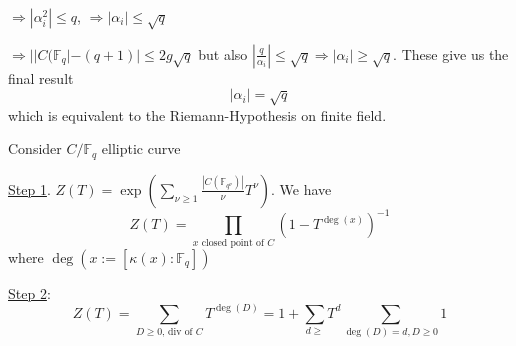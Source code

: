 \documentclass[11pt]{article}
\theoremstyle{definition}
\newcommand{\bbf}{\mathbb F}
\newcommand{\Lrta}{\Longrightarrow}
\begin{document}
$\Lrta |\alpha_i^2|\leq q$, $\Lrta |\alpha_i|\leq \sqrt{q}$

$\Lrta ||C(\bbf_q|-(q+1)|\leq 2g\sqrt{q}$ but also 
$\left|\frac{q}{\alpha_i}\right|\leq \sqrt{q}\Lrta |\alpha_i|\geq \sqrt{q}$. These give us the final result
$$
|\alpha_i|=\sqrt{q}
$$
which is equivalent to the Riemann-Hypothesis on finite field.


Consider $C/\bbf_q$ elliptic curve

\underline{Step 1}. $Z(T)=\exp\left(\sum_{\nu\geq 1}\frac{|C(\bbf_{q^\nu})|}{\nu} T^\nu\right)$. We have
 $$
 Z(T)=\prod_{x\text{ closed point of }C}(1- T^{\deg(x)})^{-1}
 $$
 where $\deg(x:=[\kappa(x):\bbf_q])$

 \underline{Step 2}:
 $$
 Z(T)=\sum_{D\geq 0\text{, div of } C} T^{\deg(D)}=1+\sum_{d\geq }T^d \sum_{\deg(D)=d, D\geq 0} 1
 $$
\end{document}
